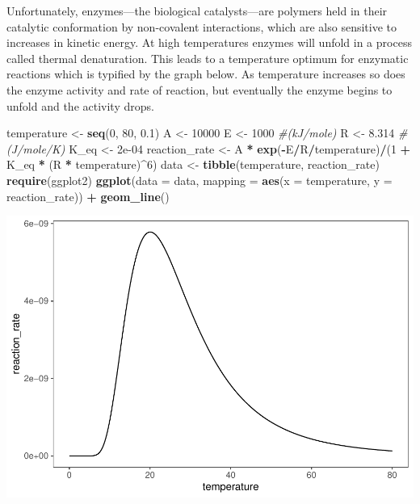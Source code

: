 \documentclass[
]{article}
\newenvironment{Shaded}{\begin{snugshade}}{\end{snugshade}}
\newcommand{\AttributeTok}[1]{\textcolor[rgb]{0.13,0.29,0.53}{#1}}
\newcommand{\CommentTok}[1]{\textcolor[rgb]{0.56,0.35,0.01}{\textit{#1}}}
\newcommand{\DecValTok}[1]{\textcolor[rgb]{0.00,0.00,0.81}{#1}}
\newcommand{\FloatTok}[1]{\textcolor[rgb]{0.00,0.00,0.81}{#1}}
\newcommand{\FunctionTok}[1]{\textcolor[rgb]{0.13,0.29,0.53}{\textbf{#1}}}
\newcommand{\NormalTok}[1]{#1}
\newcommand{\OtherTok}[1]{\textcolor[rgb]{0.56,0.35,0.01}{#1}}
\newcommand{\SpecialCharTok}[1]{\textcolor[rgb]{0.81,0.36,0.00}{\textbf{#1}}}
\begin{document}
Unfortunately, enzymes---the biological catalysts---are polymers held in their catalytic conformation by non-covalent interactions, which are also sensitive to increases in kinetic energy. At high temperatures enzymes will unfold in a process called thermal denaturation. This leads to a temperature optimum for enzymatic reactions which is typified by the graph below. As temperature increases so does the enzyme activity and rate of reaction, but eventually the enzyme begins to unfold and the activity drops.

\begin{Shaded}
\begin{Highlighting}[]
\NormalTok{temperature }\OtherTok{\textless{}{-}} \FunctionTok{seq}\NormalTok{(}\DecValTok{0}\NormalTok{, }\DecValTok{80}\NormalTok{, }\FloatTok{0.1}\NormalTok{)}
\NormalTok{A }\OtherTok{\textless{}{-}} \DecValTok{10000}
\NormalTok{E }\OtherTok{\textless{}{-}} \DecValTok{1000}  \CommentTok{\#(kJ/mole)}
\NormalTok{R }\OtherTok{\textless{}{-}} \FloatTok{8.314}  \CommentTok{\#(J/mole/K)}
\NormalTok{K\_eq }\OtherTok{\textless{}{-}} \FloatTok{2e{-}04}
\NormalTok{reaction\_rate }\OtherTok{\textless{}{-}}\NormalTok{ A }\SpecialCharTok{*} \FunctionTok{exp}\NormalTok{(}\SpecialCharTok{{-}}\NormalTok{E}\SpecialCharTok{/}\NormalTok{R}\SpecialCharTok{/}\NormalTok{temperature)}\SpecialCharTok{/}\NormalTok{(}\DecValTok{1} \SpecialCharTok{+}\NormalTok{ K\_eq }\SpecialCharTok{*}
\NormalTok{    (R }\SpecialCharTok{*}\NormalTok{ temperature)}\SpecialCharTok{\^{}}\DecValTok{6}\NormalTok{)}
\NormalTok{data }\OtherTok{\textless{}{-}} \FunctionTok{tibble}\NormalTok{(temperature, reaction\_rate)}
\FunctionTok{require}\NormalTok{(ggplot2)}
\FunctionTok{ggplot}\NormalTok{(}\AttributeTok{data =}\NormalTok{ data, }\AttributeTok{mapping =} \FunctionTok{aes}\NormalTok{(}\AttributeTok{x =}\NormalTok{ temperature,}
    \AttributeTok{y =}\NormalTok{ reaction\_rate)) }\SpecialCharTok{+} \FunctionTok{geom\_line}\NormalTok{()}
\end{Highlighting}
\end{Shaded}

\includegraphics{Bioprocess_Engineering_files/figure-latex/unnamed-chunk-5-1.pdf}
\end{document}
